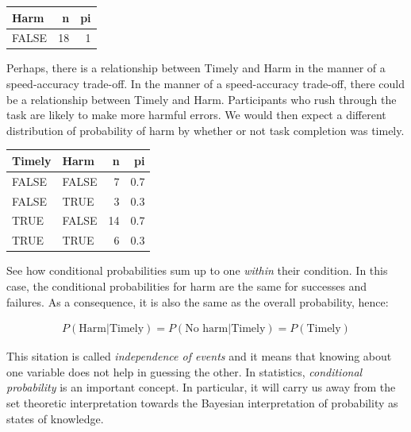 \documentclass[]{svmono}
\newenvironment{Shaded}{\begin{snugshade}}{\end{snugshade}}
\newcommand{\KeywordTok}[1]{\textcolor[rgb]{0.13,0.29,0.53}{\textbf{#1}}}
\newcommand{\DataTypeTok}[1]{\textcolor[rgb]{0.13,0.29,0.53}{#1}}
\newcommand{\StringTok}[1]{\textcolor[rgb]{0.31,0.60,0.02}{#1}}
\newcommand{\OperatorTok}[1]{\textcolor[rgb]{0.81,0.36,0.00}{\textbf{#1}}}
\newcommand{\NormalTok}[1]{#1}
\theoremstyle{definition}
\theoremstyle{definition}
\theoremstyle{definition}
\theoremstyle{remark}
\begin{document}
\begin{tabular}{l|r|r}
\hline
Harm & n & pi\\
\hline
FALSE & 18 & 1\\
\hline
\end{tabular}

Perhaps, there is a relationship between Timely and Harm in the manner
of a speed-accuracy trade-off. In the manner of a speed-accuracy
trade-off, there could be a relationship between Timely and Harm.
Participants who rush through the task are likely to make more harmful
errors. We would then expect a different distribution of probability of
harm by whether or not task completion was timely.

\begin{Shaded}
\end{Shaded}

\begin{tabular}{l|l|r|r}
\hline
Timely & Harm & n & pi\\
\hline
FALSE & FALSE & 7 & 0.7\\
\hline
FALSE & TRUE & 3 & 0.3\\
\hline
TRUE & FALSE & 14 & 0.7\\
\hline
TRUE & TRUE & 6 & 0.3\\
\hline
\end{tabular}

See how conditional probabilities sum up to one \emph{within} their
condition. In this case, the conditional probabilities for harm are the
same for successes and failures. As a consequence, it is also the same
as the overall probability, hence:

\[\begin{aligned}
P(\textrm{Harm} | \textrm{Timely}) = P(\textrm{No harm} | \textrm{Timely}) =
P(\textrm{Timely})
\end{aligned}\]

This sitation is called \emph{independence of events} and it means that
knowing about one variable does not help in guessing the other. In
statistics, \emph{conditional probability} is an important concept. In
particular, it will carry us away from the set theoretic interpretation
towards the Bayesian interpretation of probability as states of
knowledge.
\end{document}
